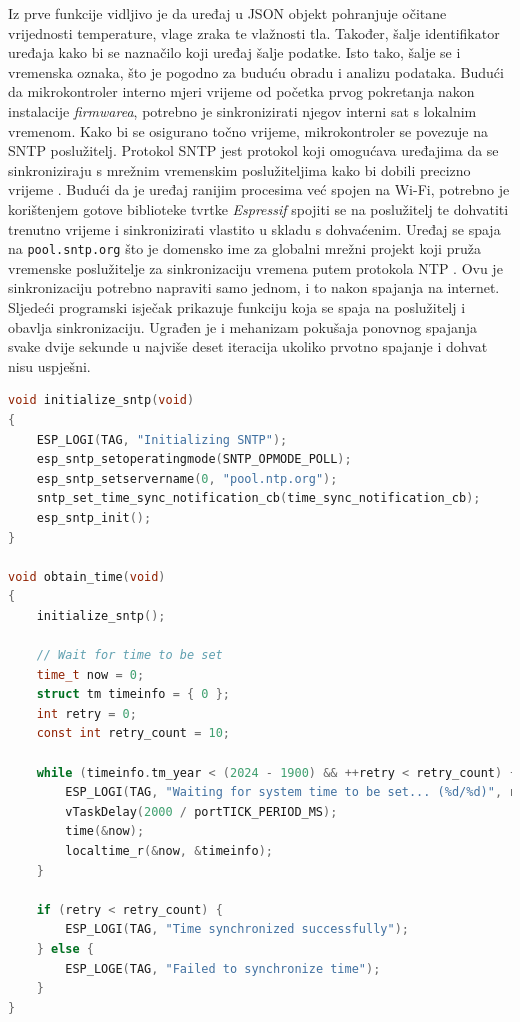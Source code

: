Iz prve funkcije vidljivo je da uređaj u JSON objekt pohranjuje očitane vrijednosti temperature, vlage zraka te vlažnosti tla. Također, šalje identifikator uređaja kako bi se naznačilo koji uređaj šalje podatke. Isto tako, šalje se i vremenska oznaka, što je pogodno za buduću obradu i analizu podataka. Budući da mikrokontroler interno mjeri vrijeme od početka prvog pokretanja nakon instalacije \textit{firmwarea}, potrebno je sinkronizirati njegov interni sat s lokalnim vremenom. Kako bi se osigurano točno vrijeme, mikrokontroler se povezuje na SNTP poslužitelj. Protokol SNTP  jest protokol koji omogućava uređajima da se sinkroniziraju s mrežnim vremenskim poslužiteljima kako bi dobili precizno vrijeme \cite{sntp}. Budući da je uređaj ranijim procesima već spojen na Wi-Fi, potrebno je korištenjem gotove biblioteke tvrtke \textit{Espressif} spojiti se na poslužitelj te dohvatiti trenutno vrijeme i sinkronizirati vlastito u skladu s dohvaćenim. Uređaj se spaja na \lstinline|pool.sntp.org| što je domensko ime za globalni mrežni projekt koji pruža vremenske poslužitelje za sinkronizaciju vremena putem protokola NTP . Ovu je sinkronizaciju potrebno napraviti samo jednom, i to nakon spajanja na internet. Sljedeći programski isječak prikazuje funkciju koja se spaja na poslužitelj i obavlja sinkronizaciju. Ugrađen je i mehanizam pokušaja ponovnog spajanja svake dvije sekunde u najviše deset iteracija ukoliko prvotno spajanje i dohvat nisu uspješni.

\begin{lstlisting}[caption={Funkcije za sinkronizaciju vremena s SNTP poslužiteljem}, language=c]
void initialize_sntp(void)
{
	ESP_LOGI(TAG, "Initializing SNTP");
	esp_sntp_setoperatingmode(SNTP_OPMODE_POLL);
	esp_sntp_setservername(0, "pool.ntp.org");
	sntp_set_time_sync_notification_cb(time_sync_notification_cb);
	esp_sntp_init();
}

void obtain_time(void)
{
	initialize_sntp();
	
	// Wait for time to be set
	time_t now = 0;
	struct tm timeinfo = { 0 };
	int retry = 0;
	const int retry_count = 10;
	
	while (timeinfo.tm_year < (2024 - 1900) && ++retry < retry_count) {
		ESP_LOGI(TAG, "Waiting for system time to be set... (%d/%d)", retry, retry_count);
		vTaskDelay(2000 / portTICK_PERIOD_MS);
		time(&now);
		localtime_r(&now, &timeinfo);
	}
	
	if (retry < retry_count) {
		ESP_LOGI(TAG, "Time synchronized successfully");
	} else {
		ESP_LOGE(TAG, "Failed to synchronize time");
	}
}
\end{lstlisting}

